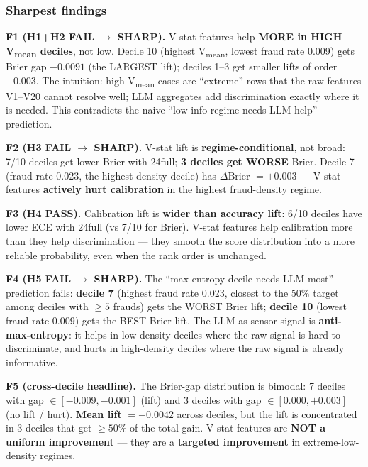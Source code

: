 \subsubsection{Sharpest findings}\label{sec:p8-iter192-findings}

\textbf{F1 (H1+H2 FAIL $\rightarrow$ SHARP).}
V-stat features help \textbf{MORE in HIGH V\textsubscript{mean} deciles}, not low.
Decile 10 (highest V\textsubscript{mean}, lowest fraud rate 0.009) gets
Brier gap $-0.0091$ (the LARGEST lift); deciles 1--3 get smaller lifts
of order $-0.003$. The intuition: high-V\textsubscript{mean} cases are
``extreme'' rows that the raw features V1--V20 cannot resolve well; LLM
aggregates add discrimination exactly where it is needed. This
contradicts the naive ``low-info regime needs LLM help'' prediction.

\textbf{F2 (H3 FAIL $\rightarrow$ SHARP).}
V-stat lift is \textbf{regime-conditional}, not broad: 7/10 deciles get
lower Brier with 24full; \textbf{3 deciles get WORSE} Brier. Decile 7
(fraud rate 0.023, the highest-density decile) has $\Delta$Brier $= +0.003$
--- V-stat features \textbf{actively hurt calibration} in the highest
fraud-density regime.

\textbf{F3 (H4 PASS).}
Calibration lift is \textbf{wider than accuracy lift}: 6/10 deciles have
lower ECE with 24full (vs 7/10 for Brier). V-stat features help calibration
more than they help discrimination --- they smooth the score distribution
into a more reliable probability, even when the rank order is unchanged.

\textbf{F4 (H5 FAIL $\rightarrow$ SHARP).}
The ``max-entropy decile needs LLM most'' prediction fails:
\textbf{decile 7} (highest fraud rate 0.023, closest to the 50\% target
among deciles with $\geq 5$ frauds) gets the WORST Brier lift; \textbf{decile 10}
(lowest fraud rate 0.009) gets the BEST Brier lift. The LLM-as-sensor
signal is \textbf{anti-max-entropy}: it helps in low-density deciles
where the raw signal is hard to discriminate, and hurts in high-density
deciles where the raw signal is already informative.

\textbf{F5 (cross-decile headline).}
The Brier-gap distribution is bimodal: 7 deciles with gap
$\in [-0.009, -0.001]$ (lift) and 3 deciles with gap $\in [0.000, +0.003]$
(no lift / hurt). \textbf{Mean lift} $= -0.0042$ across deciles, but the
lift is concentrated in 3 deciles that get $\geq 50\%$ of the total
gain. V-stat features are \textbf{NOT a uniform improvement} --- they are
a \textbf{targeted improvement} in extreme-low-density regimes.

